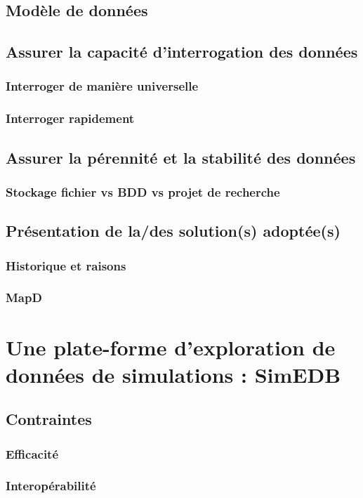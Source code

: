 	\subsection{Modèle de données}
	\subsection{Assurer la capacité d'interrogation des données}
		\subsubsection{Interroger de manière universelle}
		\subsubsection{Interroger rapidement}
	\subsection{Assurer la pérennité et la stabilité des données}
		\subsubsection{Stockage fichier vs BDD vs projet de recherche}
	\subsection{Présentation de la/des solution(s) adoptée(s)}
		\subsubsection{Historique et raisons}
		\subsubsection{MapD}
	
\section{Une plate-forme d'exploration de données de simulations : SimEDB}
	\subsection{Contraintes}
		\subsubsection{Efficacité}
		\subsubsection{Interopérabilité}
